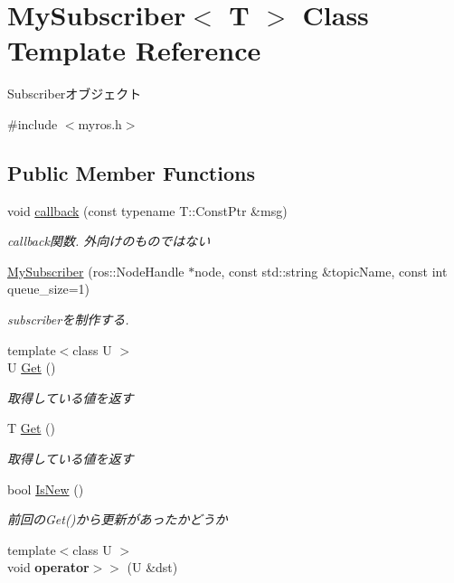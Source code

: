 \hypertarget{classMySubscriber}{\section{My\-Subscriber$<$ T $>$ Class Template Reference}
\label{classMySubscriber}
}


Subscriberオブジェクト  




{\ttfamily \#include $<$myros.\-h$>$}

\subsection*{Public Member Functions}
\begin{DoxyCompactItemize}
\item 
void \hyperlink{classMySubscriber_a48c3a49953cd13c3487873aaee7fc8b2}{callback} (const typename T\-::\-Const\-Ptr \&msg)
\begin{DoxyCompactList}\small\item\em callback関数. 外向けのものではない \end{DoxyCompactList}\item 
\hyperlink{classMySubscriber_a6ab072d202da8fd343997a320b671fba}{My\-Subscriber} (ros\-::\-Node\-Handle $\ast$node, const std\-::string \&topic\-Name, const int queue\-\_\-size=1)
\begin{DoxyCompactList}\small\item\em subscriberを制作する. \end{DoxyCompactList}\item 
{\footnotesize template$<$class U $>$ }\\U \hyperlink{classMySubscriber_a72254fd18a242511f018f0cb47fb8493}{Get} ()
\begin{DoxyCompactList}\small\item\em 取得している値を返す \end{DoxyCompactList}\item 
T \hyperlink{classMySubscriber_a360ba8202d5c72d225925ed6188052be}{Get} ()
\begin{DoxyCompactList}\small\item\em 取得している値を返す \end{DoxyCompactList}\item 
bool \hyperlink{classMySubscriber_ab6fa45cf088da2b7b47530d49d203ccb}{Is\-New} ()
\begin{DoxyCompactList}\small\item\em 前回の\-Get()から更新があったかどうか \end{DoxyCompactList}\item 
\hypertarget{classMySubscriber_a61d722cf8524700d9979280c4a0308ef}{{\footnotesize template$<$class U $>$ }\\void {\bfseries operator$>$$>$} (U \&dst)}\label{classMySubscriber_a61d722cf8524700d9979280c4a0308ef}

\end{DoxyCompactItemize}


